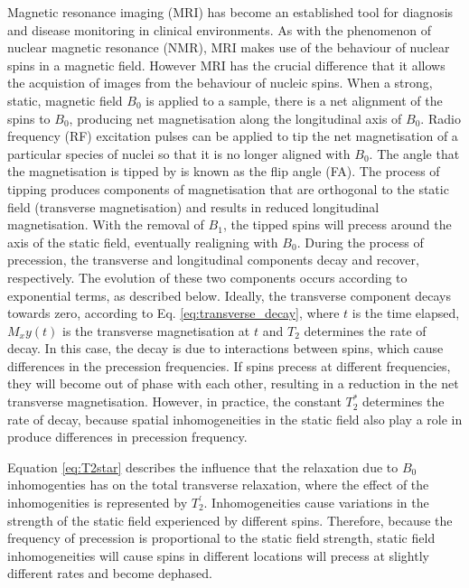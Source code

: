 \documentclass[3p, twocolumn]{elsarticle}
\begin{document}
Magnetic resonance imaging (MRI) has become an established tool for diagnosis and disease monitoring in clinical environments. As with the phenomenon of nuclear magnetic resonance (NMR), MRI makes use of the behaviour of nuclear spins in a magnetic field. However MRI has the crucial difference that it allows the acquistion of images from the behaviour of nucleic spins.  When a strong, static, magnetic field $B_0$ is applied to a sample, there is a net alignment of the spins to $B_0 $, producing net magnetisation along the longitudinal axis of $B_0$. Radio frequency (RF) excitation pulses can be applied to tip the net magnetisation of a particular species of nuclei so that it is no longer aligned with $B_0$. The angle that the magnetisation is tipped by is known as the flip angle (FA). The process of tipping produces components of magnetisation that are orthogonal to the static field (transverse magnetisation) and results in reduced longitudinal magnetisation. With the removal of $B_1$, the tipped spins will precess around the axis of the static field, eventually realigning with $B_0$. During the process of precession, the transverse and longitudinal components decay and recover, respectively. The evolution of these two components occurs according to exponential terms, as described below. Ideally, the transverse component decays towards zero, according to Eq. \eqref{eq:transverse_decay}, where $t$ is the time elapsed, $M_xy(t)$ is the transverse magnetisation at $t$ and $T_2$ determines the rate of decay. In this case, the decay is due to interactions between spins, which cause differences in the precession frequencies. If spins precess at different frequencies, they will become out of phase with each other, resulting in a reduction in the net transverse magnetisation. However, in practice, the constant $T^{*}_{2}$ determines the rate of decay, because spatial inhomogeneities in the static field also play a role in produce differences in precession frequency.

Equation \eqref{eq:T2star} describes the influence that the relaxation due to $B_0$ inhomogenties has on the total transverse relaxation, where the effect of the inhomogenities is represented by $T^{'}_{2}$. Inhomogeneities cause variations in the strength of the static field experienced by different spins. Therefore, because the frequency of precession is proportional to the static field strength, static field inhomogeneities will cause spins in different locations will precess at slightly different rates and become dephased.
\end{document}
